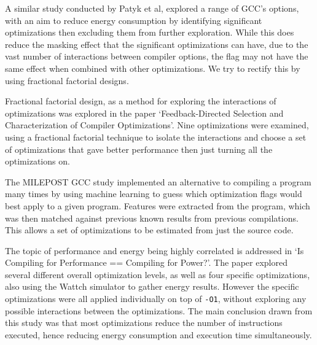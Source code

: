 \documentclass[twocolumn]{article}
\begin{document}

A similar study conducted by Patyk et al\cite{EnergyReductionCompilerOptions}, explored a range of GCC's options, with an aim to reduce energy consumption by identifying significant optimizations then excluding them from further exploration. While this does reduce the masking effect that the significant optimizations can have, due to the vast number of interactions between compiler options, the flag may not have the same effect when combined with other optimizations. We try to rectify this by using fractional factorial designs.

Fractional factorial design, as a method for exploring the interactions of optimizations was explored in the paper `Feedback-Directed Selection and Characterization of Compiler Optimizations'\cite{IntelPaper}. Nine optimizations were examined, using a fractional factorial technique to isolate the interactions and choose a set of optimizations that gave better performance then just turning all the optimizations on.

The MILEPOST GCC study implemented an alternative to compiling a program many times by using machine learning to guess which optimization flags would best apply to a given program. Features were extracted from the program, which was then matched against previous known results from previous compilations. This allows a set of optimizations to be estimated from just the source code.

The topic of performance and energy being highly correlated is addressed in `Is Compiling for Performance == Compiling for Power?'\cite{CompilingForPerformancePower}. The paper explored several different overall optimization levels, as well as four specific optimizations, also using the Wattch simulator to gather energy results. However the specific optimizations were all applied individually on top of \texttt{-O1}, without exploring any possible interactions between the optimizations. The main conclusion drawn from this study was that most optimizations reduce the number of instructions executed, hence reducing energy consumption and execution time simultaneously.
\end{document}

